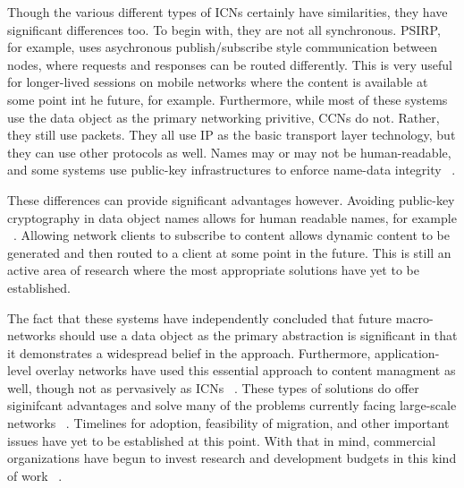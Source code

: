 Though the various different types of ICNs certainly have similarities, they have significant differences too.  To begin with, they are not all synchronous.  PSIRP, for example, uses asychronous publish/subscribe style communication between nodes, where requests and responses can be routed differently.  This is very useful for longer-lived sessions on mobile networks where the content is available at some point int he future, for example.  Furthermore, while most of these systems use the data object as the primary networking privitive, CCNs do not.  Rather, they still use packets.  They all use IP as the basic transport layer technology, but they can use other protocols as well.  Names may or may not be human-readable, and some systems use public-key infrastructures to enforce name-data integrity ~\cite{6231276}.

These differences can provide significant advantages however.  Avoiding public-key cryptography in data object names allows for human readable names, for example ~\cite{6231276}.  Allowing network clients to subscribe to content allows dynamic content to be generated and then routed to a client at some point in the future.  This is still an active area of research where the most appropriate solutions have yet to be established.

The fact that these systems have independently concluded that future macro-networks should use a data object as the primary abstraction is significant in that it demonstrates a widespread belief in the approach.  Furthermore, application-level overlay networks have used this essential approach to content managment as well, though not as pervasively as ICNs ~\cite{Tarkoma:2010:ONT:1805887}.  These types of solutions do offer siginifcant advantages and solve many of the problems currently facing large-scale networks ~\cite{6231276}.  Timelines for adoption, feasibility of migration, and other important issues have yet to be established at this point.  With that in mind, commercial organizations have begun to invest research and development budgets in this kind of work ~\cite{xerox,parc}.  

	
